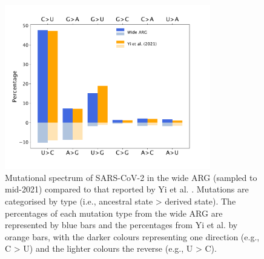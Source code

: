 \documentclass{article}
\begin{document}
\begin{figure}
\centering
\includegraphics[width=0.8\textwidth]{figures/mutational_spectra.pdf}
\caption{\label{fig:mutational_spectra} Mutational spectrum of SARS-CoV-2 in the wide ARG (sampled to mid-2021) compared to that reported by Yi et al. \cite{Yi2021-sc}. Mutations are categorised by type (i.e., ancestral state > derived state). The percentages of each mutation type from the wide ARG are represented by blue bars and the percentages from Yi et al. by orange bars, with the darker colours representing one direction (e.g., C > U) and the lighter colours the reverse (e.g., U > C).}
\end{figure}



\end{document}
